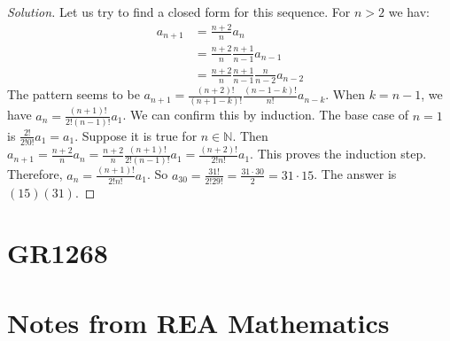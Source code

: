 \documentclass[crop=false,class=book,oneside]{standalone}
\begin{document}
            \begin{proof}[Solution]
            Let us try to find a closed form for this sequence. For $n>2$ we hav:
            \begin{align*}
                a_{n+1} &= \frac{n+2}{n}a_n \\
                &= \frac{n+2}{n}\frac{n+1}{n-1}a_{n-1}\\
                &= \frac{n+2}{n}\frac{n+1}{n-1}\frac{n}{n-2}a_{n-2}
            \end{align*}
            The pattern seems to be $a_{n+1} = \frac{(n+2)!}{(n+1-k)!}\frac{(n-1-k)!}{n!}a_{n-k}$. When $k=n-1$, we have $a_{n} = \frac{(n+1)!}{2!(n-1)!}a_1$. We can confirm this by induction. The base case of $n=1$ is $\frac{2!}{2!0!}a_1 = a_1$. Suppose it is true for $n\in \mathbb{N}$. Then $a_{n+1} = \frac{n+2}{n} a_n = \frac{n+2}{n} \frac{(n+1)!}{2!(n-1)!}a_1 = \frac{(n+2)!}{2!n!}a_1$. This proves the induction step. Therefore, $a_n = \frac{(n+1)!}{2!n!}a_1$. So $a_{30} = \frac{31!}{2!29!} = \frac{31\cdot 30}{2} = 31\cdot 15$. The answer is $(15)(31)$.
            \end{proof}
    \section{GR1268}
    \newpage
    \section{Notes from REA Mathematics}
\end{document}
